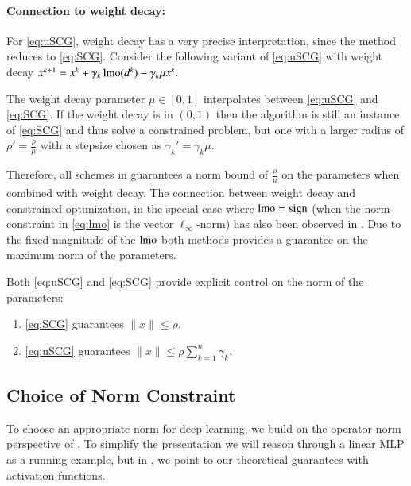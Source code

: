 \paragraph{Connection to weight decay:}
For \ref{eq:uSCG}, weight decay has a very precise interpretation,
 since the method reduces to \ref{eq:SCG}.
Consider the following variant of \ref{eq:uSCG} with weight decay $
x^{k+1} = x^k + \gamma_k\operatorname{lmo}(d^k) - \gamma_k \mu x^k.$

The weight decay parameter $\mu\in [0,1]$ interpolates between \ref{eq:uSCG} and \ref{eq:SCG}.
If the weight decay is in $(0,1)$ then the algorithm is still an instance of \ref{eq:SCG} and thus solve a constrained problem, but one with a larger radius of $\rho' = \tfrac{\rho}{\mu}$ with a stepsize chosen as $\gamma_k'=\gamma_k \mu$.

Therefore, all schemes in  guarantees a norm bound of $\tfrac{\rho}{\mu}$ on the parameters when combined with weight decay.
The connection between weight decay and constrained optimization, in the special case where $\operatorname{lmo}=\operatorname{sign}$ (when the norm-constraint in \eqref{eq:lmo} is the vector $\ell_\infty$-norm) has also been observed in \citet{xie2024implicit,d2023we}.
Due to the fixed magnitude of the $\operatorname{lmo}$ both methods provides a guarantee on the maximum norm of the parameters.

\begin{insightbox}[label={insight:weight-decay}]
Both \ref{eq:uSCG} and \ref{eq:SCG} provide explicit control on the norm of the parameters:
\begin{enumerate}[label=(\roman*)]
  \item \ref{eq:SCG} guarantees $\|x\| \leq \rho$.
  \item \ref{eq:uSCG} guarantees $\|x\| \leq \rho\sum_{k=1}^{n}\gamma_k$.
\end{enumerate}
\end{insightbox}

\subsection{Choice of Norm Constraint}\label{sec:normchoice}

To choose an appropriate norm for deep learning, we build on the operator norm perspective of \citet{large2024scalable}. 
To simplify the presentation we will reason through a linear MLP as a running example, but in , we point to our theoretical guarantees with activation functions.

